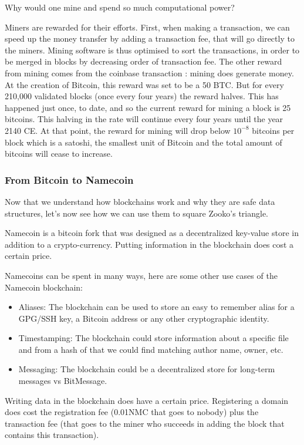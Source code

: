 \documentclass{vldb}
\begin{document}
Why would one mine and spend so much computational power?


Miners are rewarded for their efforts. First, when making a transaction, we can speed up the money transfer by adding a transaction fee, that will go directly to the miners. Mining software is thus optimised to sort the transactions, in order to be merged in blocks by decreasing order of transaction fee. 
The other reward from mining comes from the coinbase transaction : mining does generate money.  At the creation of Bitcoin, this reward was set to be a 50 BTC. But for every 210,000 validated blocks (once every four years) the reward halves. This has happened just once, to date, and so the current reward for mining a block is 25 bitcoins. This halving in the rate will continue every four years until the year 2140 CE. At that point, the reward for mining will drop below $10^{-8}$ bitcoins per block which is a satoshi, the smallest unit of Bitcoin and the total amount of bitcoins will cease to increase.

\subsubsection{From Bitcoin to Namecoin}

Now that we understand how blockchains work and why they are safe data structures, let's now see how we can use them to square Zooko's triangle. 

Namecoin is a bitcoin fork that was designed as a decentralized key-value store in addition to a crypto-currency. Putting information in the blockchain does cost a certain price.

Namecoins can be spent in many ways, here are some other use cases of the Namecoin blockchain:
\begin{itemize}
\item Aliases: The blockchain can be used to store an easy to remember alias for a GPG/SSH key, a Bitcoin address or any other cryptographic identity.
\item Timestamping: The blockchain could store information about a specific file and from a hash of that we could find matching author name, owner, etc.
\item Messaging: The blockchain could be a decentralized store for  long-term messages vs BitMessage.
\end{itemize}

Writing data in the blockchain does have a certain price. Registering a domain does cost the registration fee (0.01NMC that goes to nobody) plus the transaction fee (that goes to the miner who succeeds in adding the block that contains this transaction).
\end{document}
